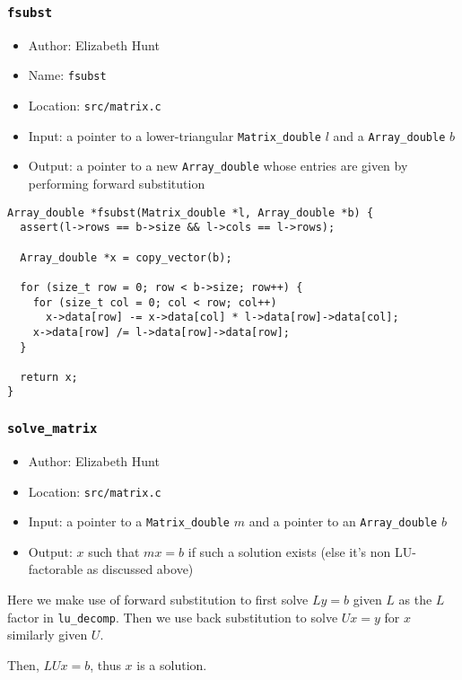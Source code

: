 \documentclass[11pt]{article}
\begin{document}
\subsubsection{\texttt{fsubst}}
\label{sec:org60d3435}
\begin{itemize}
\item Author: Elizabeth Hunt
\item Name: \texttt{fsubst}
\item Location: \texttt{src/matrix.c}
\item Input: a pointer to a lower-triangular \texttt{Matrix\_double} \(l\) and a \texttt{Array\_double}
\(b\)
\item Output: a pointer to a new \texttt{Array\_double} whose entries are given by performing
forward substitution
\end{itemize}

\begin{verbatim}
Array_double *fsubst(Matrix_double *l, Array_double *b) {
  assert(l->rows == b->size && l->cols == l->rows);

  Array_double *x = copy_vector(b);

  for (size_t row = 0; row < b->size; row++) {
    for (size_t col = 0; col < row; col++)
      x->data[row] -= x->data[col] * l->data[row]->data[col];
    x->data[row] /= l->data[row]->data[row];
  }

  return x;
}
\end{verbatim}

\subsubsection{\texttt{solve\_matrix}}
\label{sec:org914121f}
\begin{itemize}
\item Author: Elizabeth Hunt
\item Location: \texttt{src/matrix.c}
\item Input: a pointer to a \texttt{Matrix\_double} \(m\) and a pointer to an \texttt{Array\_double} \(b\)
\item Output: \(x\) such that \(mx = b\) if such a solution exists (else it's non LU-factorable as discussed
above)
\end{itemize}

Here we make use of forward substitution to first solve \(Ly = b\) given \(L\) as the \(L\) factor in
\texttt{lu\_decomp}. Then we use back substitution to solve \(Ux = y\) for \(x\) similarly given \(U\).

Then, \(LUx = b\), thus \(x\) is a solution.
\end{document}
